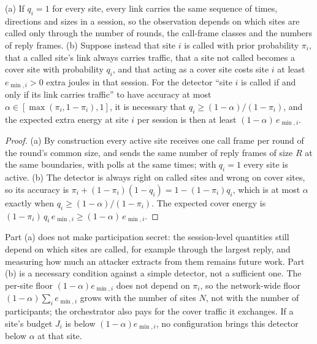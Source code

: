 \begin{proposition}\label{prop:cover}
(a) If $q_i=1$ for every site, every link carries the same sequence of times, directions and sizes in a session, so the observation depends on which sites are called only through the number of rounds, the call-frame classes and the numbers of reply frames. (b) Suppose instead that site $i$ is called with prior probability $\pi_i$, that a called site's link always carries traffic, that a site not called becomes a cover site with probability $q_i$, and that acting as a cover site costs site $i$ at least $e_{\min,i}>0$ extra joules in that session. For the detector ``site $i$ is called if and only if its link carries traffic'' to have accuracy at most $\alpha\in[\max(\pi_i,1-\pi_i),1]$, it is necessary that $q_i\ge(1-\alpha)/(1-\pi_i)$, and the expected extra energy at site $i$ per session is then at least $(1-\alpha)\,e_{\min,i}$.
\end{proposition}
\begin{proof}
(a) By construction every active site receives one call frame per round of the round's common size, and sends the same number of reply frames of size $R$ at the same boundaries, with polls at the same times; with $q_i=1$ every site is active. (b) The detector is always right on called sites and wrong on cover sites, so its accuracy is $\pi_i+(1-\pi_i)(1-q_i)=1-(1-\pi_i)q_i$, which is at most $\alpha$ exactly when $q_i\ge(1-\alpha)/(1-\pi_i)$. The expected cover energy is $(1-\pi_i)\,q_i\,e_{\min,i}\ge(1-\alpha)\,e_{\min,i}$.
\end{proof}
Part (a) does not make participation secret: the session-level quantities still depend on which sites are called, for example through the largest reply, and measuring how much an attacker extracts from them remains future work. Part (b) is a necessary condition against a simple detector, not a sufficient one. The per-site floor $(1-\alpha)e_{\min,i}$ does not depend on $\pi_i$, so the network-wide floor $(1-\alpha)\sum_i e_{\min,i}$ grows with the number of sites $N$, not with the number of participants; the orchestrator also pays for the cover traffic it exchanges. If a site's budget $J_i$ is below $(1-\alpha)e_{\min,i}$, no configuration brings this detector below $\alpha$ at that site.

